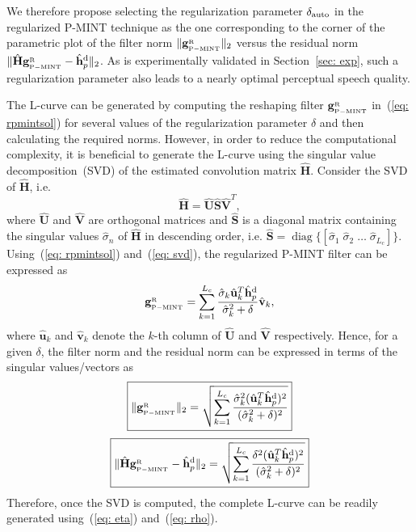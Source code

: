 \documentclass[10pt]{IEEEtran}
\DeclareMathOperator{\diag}{diag}
\begin{document}
We therefore propose selecting the regularization parameter $\delta_{\rm auto}$ in the regularized P-MINT technique as the one corresponding to the corner of the parametric plot of the filter norm $\|\mathbf{g}_{{}_{\rm P-MINT}}^{_{\rm R}}\|_2$ versus the residual norm $\|\hat{\mathbf{H}}\mathbf{g}_{{}_{\rm P-MINT}}^{_{\rm R}} - \hat{\mathbf{h}}_p^{\rm d}\|_2$.
As is experimentally validated in Section~\ref{sec: exp}, such a regularization parameter also leads to a nearly optimal perceptual speech quality.

The L-curve can be generated by computing the reshaping filter $\mathbf{g}_{{}_{\rm P-MINT}}^{_{\rm R}}$ in~(\ref{eq: rpmintsol}) for several values of the regularization parameter $\delta$ and then calculating the required norms.
However, in order to reduce the computational complexity, it is beneficial to generate the L-curve using the singular value decomposition~(SVD) of the estimated convolution matrix $\hat{\mathbf{H}}$.
Consider the SVD of $\hat{\mathbf{H}}$, i.e.
\begin{equation}
\label{eq: svd}
  \hat{\mathbf{H}} = \hat{\mathbf{U}}\hat{\mathbf{S}}\hat{\mathbf{V}}^T,
\end{equation}
where $\hat{\mathbf{U}}$ and $\hat{\mathbf{V}}$ are orthogonal matrices and $\hat{\mathbf{S}}$ is a diagonal matrix containing the singular values $\hat{\sigma}_n$ of $\hat{\mathbf{H}}$ in descending order, i.e. $\hat{\mathbf{S}} = {\diag}\{\left[\hat{\sigma}_1 \; \hat{\sigma}_2 \; \ldots \; \hat{\sigma}_{L_c}\right]\}$.
Using~(\ref{eq: rpmintsol}) and~(\ref{eq: svd}), the regularized P-MINT filter can be expressed as
\begin{equation}
\mathbf{g}_{{}_{\rm P-MINT}}^{_{\rm R}}  =  \sum_{k=1}^{L_c} \frac{\hat{\sigma}_k \hat{\mathbf{u}}_k^T \hat{\mathbf{h}}_p^{\rm d} }{\hat{\sigma}_k^2+\delta}  \hat{\mathbf{v}}_k,
\end{equation}
where $\hat{\mathbf{u}}_k$ and $\hat{\mathbf{v}}_k$ denote the $k$-th column of $\hat{\mathbf{U}}$ and $\hat{\mathbf{V}}$ respectively.
Hence, for a given $\delta$, the filter norm and the residual norm can be expressed in terms of the singular values/vectors as
\begin{equation}
\label{eq: eta}
\boxed{\|\mathbf{g}_{{}_{\rm P-MINT}}^{_{\rm R}}\|_2 = \sqrt{\sum_{k = 1}^{L_c} \frac{\hat{\sigma}_k^2 (\hat{\mathbf{u}}_k^T \hat{\mathbf{h}}_p^{\rm d})^2}{(\hat{\sigma}_k^2 + \delta)^2}}}
\end{equation}
\begin{equation}
\label{eq: rho}
\boxed{ \|\hat{\mathbf{H}}\mathbf{g}_{{}_{\rm P-MINT}}^{_{\rm R}} - \hat{\mathbf{h}}_p^{\rm d}\|_2 = \sqrt{\sum_{k = 1}^{L_c} \frac{\delta^2 (\hat{\mathbf{u}}_k^T \hat{\mathbf{h}}_p^{\rm d})^2}{(\hat{\sigma}_k^2 + \delta)^2}}}
\end{equation}
Therefore, once the SVD is computed, the complete L-curve can be readily generated using~(\ref{eq: eta}) and~(\ref{eq: rho}).
\end{document}
